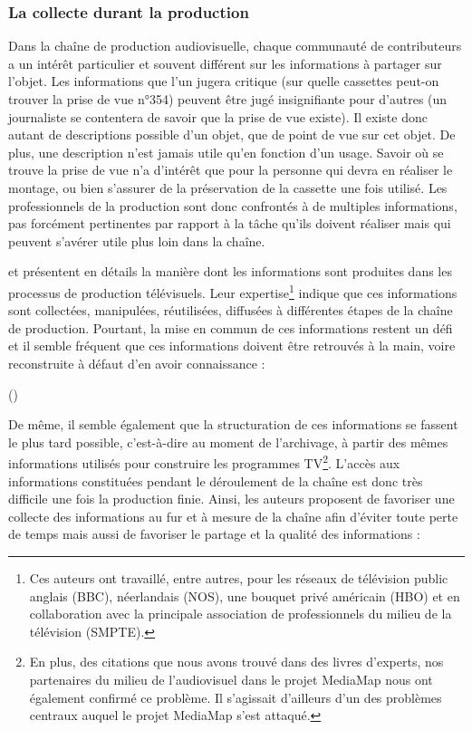 \subsubsection{La collecte durant la production}
Dans la chaîne de production audiovisuelle, chaque communauté de contributeurs a un intérêt particulier et souvent différent sur les informations à partager sur l'objet. 
Les informations que l'un jugera critique (sur quelle cassettes peut-on trouver la prise de vue n°354) peuvent être jugé insignifiante pour d'autres (un journaliste se contentera de savoir que la prise de vue existe). 
Il existe donc autant de descriptions possible d'un objet, que de point de vue sur cet objet. 
De plus, une description n'est jamais utile qu'en fonction d'un usage. 
Savoir où se trouve la prise de vue n'a d'intérêt que pour la personne qui devra en réaliser le montage, ou bien s'assurer de la préservation de la cassette une fois utilisé. 
Les professionnels de la production sont donc confrontés à de multiples informations, pas forcément pertinentes par rapport à la tâche qu'ils doivent réaliser mais qui peuvent s'avérer utile plus loin dans la chaîne.  

\citeauthor{Rayers2002} et \cite{Austerberry2004} présentent en détails la manière dont les informations sont produites dans les processus de production télévisuels. 
Leur expertise\footnote{Ces auteurs ont travaillé, entre autres, pour les réseaux de télévision public anglais (BBC), néerlandais (NOS), une bouquet privé américain (HBO) et en collaboration avec la principale association de professionnels du milieu de la télévision (SMPTE).} indique que ces informations
sont collectées, manipulées,  réutilisées, diffusées à différentes étapes de la chaîne de production. 
Pourtant, la mise en commun de ces informations restent un défi et il semble fréquent que ces informations doivent être retrouvés à la main, voire reconstruite à défaut d'en avoir connaissance :

 (\cite[p.22, Metadata in the Workflow]{Austerberry2004})

De même, il semble également que la structuration de ces informations se fassent le plus tard possible, c'est-à-dire au moment de l'archivage, à partir des mêmes informations utilisés pour construire les programmes TV\footnote{En plus, des citations que nous avons trouvé dans des livres d'experts, nos partenaires du milieu de l'audiovisuel dans le projet MediaMap nous ont également confirmé ce problème. Il s'agissait d'ailleurs d'un des problèmes centraux auquel le projet MediaMap s'est attaqué.}.
L'accès aux informations constituées pendant le déroulement de la chaîne est donc très difficile une fois la production finie.
Ainsi, les auteurs proposent de favoriser une collecte des informations au fur et à mesure de la chaîne afin d'éviter toute perte de temps mais aussi de favoriser le partage et la qualité des informations : 

